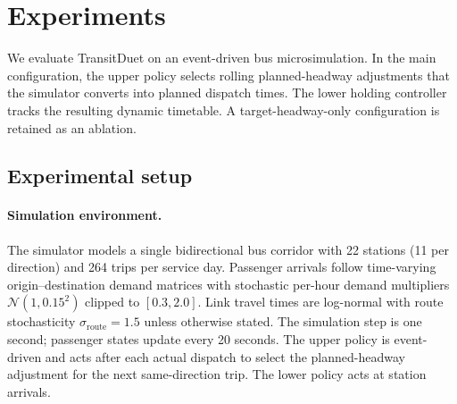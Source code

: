 \section{Experiments}
\label{sec:experiments}

We evaluate TransitDuet on an event-driven bus microsimulation. In the main configuration, the upper policy selects rolling planned-headway adjustments that the simulator converts into planned dispatch times. The lower holding controller tracks the resulting dynamic timetable. A target-headway-only configuration is retained as an ablation.

\subsection{Experimental setup}
\label{sec:exp_setup}

\paragraph{Simulation environment.}
The simulator models a single bidirectional bus corridor with 22 stations (11 per direction) and 264 trips per service day. Passenger arrivals follow time-varying origin--destination demand matrices with stochastic per-hour demand multipliers $\mathcal{N}(1,0.15^2)$ clipped to $[0.3,2.0]$. Link travel times are log-normal with route stochasticity $\sigma_{\mathrm{route}}=1.5$ unless otherwise stated. The simulation step is one second; passenger states update every 20 seconds. The upper policy is event-driven and acts after each actual dispatch to select the planned-headway adjustment for the next same-direction trip. The lower policy acts at station arrivals.

